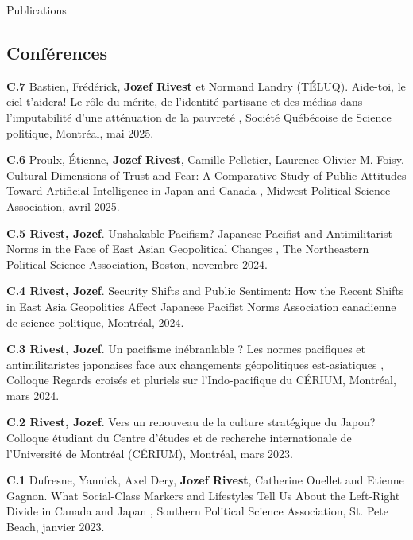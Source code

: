 \documentclass{resume} %
\begin{document}
\begin{rSection}{Publications}
	\subsection*{Conférences}

	{\textbf{C.7} Bastien, Frédérick, \textbf{Jozef Rivest} et
		Normand Landry (TÉLUQ). \og Aide-toi, le ciel t'aidera!
		Le rôle du mérite, de l'identité partisane et des médias
		dans l'imputabilité d'une atténuation de la pauvreté \fg{},
		Société Québécoise de Science politique, Montréal, mai
		2025.}

	{\textbf{C.6} Proulx, Étienne, \textbf{Jozef Rivest}, Camille
		Pelletier, Laurence-Olivier M. Foisy. \og Cultural Dimensions
		of Trust and Fear: A Comparative Study of Public Attitudes
		Toward Artificial Intelligence in Japan and Canada \fg{}, Midwest
		Political Science Association, avril 2025.}

	{\textbf{C.5 Rivest, Jozef}. \og Unshakable Pacifism?
		Japanese Pacifist and Antimilitarist Norms in the Face of
		East Asian Geopolitical Changes \fg{}, The Northeastern Political
		Science Association, Boston, novembre 2024.}

	{\textbf{C.4 Rivest, Jozef}. \og Security Shifts and Public
		Sentiment: How the Recent Shifts in East Asia Geopolitics
		Affect Japanese Pacifist Norms \fg{} Association canadienne de
		science politique, Montréal, 2024.}

	{\textbf{C.3 Rivest, Jozef}. \og Un pacifisme inébranlable
		? Les normes pacifiques et antimilitaristes japonaises face
		aux changements géopolitiques est-asiatiques \fg{}, Colloque
		Regards croisés et pluriels sur l'Indo-pacifique du CÉRIUM,
		Montréal, mars 2024.}

	{\textbf{C.2 Rivest, Jozef}. \og Vers un renouveau de la
		culture stratégique du Japon? \fg{} Colloque étudiant du Centre
		d'études et de recherche internationale de l'Université de
		Montréal (CÉRIUM), Montréal, mars 2023.} \par

	{\textbf{C.1} Dufresne, Yannick, Axel Dery, \textbf{Jozef
			Rivest}, Catherine Ouellet and Etienne Gagnon. \og What
		Social-Class Markers and Lifestyles Tell Us About the
		Left-Right Divide in Canada and Japan \fg{}, Southern Political
		Science Association, St. Pete Beach, janvier 2023.}



\end{rSection}
\end{document}
